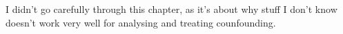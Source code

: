 I didn't go carefully through this chapter, as it's about why stuff I don't know doesn't work very well for analysing and treating counfounding.


